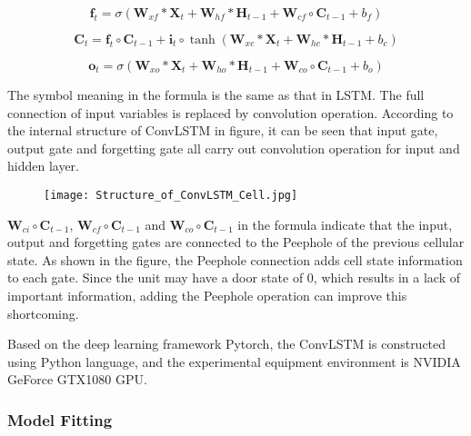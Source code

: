 \documentclass[../main]{subfiles}
\begin{document}
\begin{equation}
\mathbf{f}_t=\sigma(\mathbf{W}_{xf}*\mathbf{X}_{t}+\mathbf{W}_{hf}*\mathbf{H}_{t-1}+\mathbf{W}_{cf}\circ\mathbf{C}_{t-1}+b_f) 
\end{equation}

\begin{equation}
\mathbf{C}_t=\mathbf{f}_{t}\circ\mathbf{C}_{t-1}+\mathbf{i}_t\circ\tanh(\mathbf{W}_{xc}*\mathbf{X}_{t}+\mathbf{W}_{hc}*\mathbf{H}_{t-1}+b_c)
\end{equation}

\begin{equation}
\mathbf{o}_t=\sigma(\mathbf{W}_{xo}*\mathbf{X}_{t}+\mathbf{W}_{ho}*\mathbf{H}_{t-1}+\mathbf{W}_{co}\circ\mathbf{C}_{t-1}+b_o)
\end{equation}

The symbol meaning in the formula is the same as that in LSTM. The full
connection of input variables is replaced by convolution operation.
According to the internal structure of ConvLSTM in figure, it can be
seen that input gate, output gate and forgetting gate all carry out
convolution operation for input and hidden layer.

\begin{figure}
\centering
\texttt{[image: Structure\_of\_ConvLSTM\_Cell.jpg]}
\caption{}
\end{figure}

\(\mathbf{W}_{ci}\circ\mathbf{C}_{t-1}\),
\(\mathbf{W}_{cf}\circ\mathbf{C}_{t-1}\) and
\(\mathbf{W}_{co}\circ\mathbf{C}_{t-1}\) in the formula indicate
that the input, output and forgetting gates are connected to the
Peephole\cite{861302} of the previous cellular state. As shown in
the figure, the Peephole connection adds cell state information to each
gate. Since the unit may have a door state of 0, which results in a lack
of important information, adding the Peephole operation can improve this
shortcoming.

Based on the deep learning framework Pytorch, the ConvLSTM is
constructed using Python language, and the experimental equipment
environment is NVIDIA GeForce GTX1080 GPU.

\hypertarget{model-fitting}{%
\subsubsection{Model Fitting}\label{model-fitting}}
\end{document}
